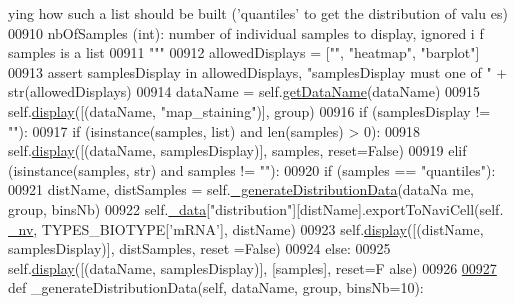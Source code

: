 \begin{DoxyCode}
{      ying how such a list should be built ('quantiles' to get the distribution of valu
      es)}
00910 \textcolor{stringliteral}{            nbOfSamples (int): number of individual samples to display, ignored i
      f samples is a list}
00911 \textcolor{stringliteral}{        """}
00912         allowedDisplays = [\textcolor{stringliteral}{""}, \textcolor{stringliteral}{"heatmap"}, \textcolor{stringliteral}{"barplot"}]
00913         \textcolor{keyword}{assert} samplesDisplay \textcolor{keywordflow}{in} allowedDisplays, \textcolor{stringliteral}{"samplesDisplay must one of "} +
       str(allowedDisplays)
00914         dataName = self.\hyperlink{classnavicom_1_1navicom_1_1NaviCom_a51ecb41beebc7636bde73be2e1ffc407}{getDataName}(dataName)
00915         self.\hyperlink{classnavicom_1_1navicom_1_1NaviCom_ad7d4390d700d4a6d2533647887f8ab94}{display}([(dataName, \textcolor{stringliteral}{"map\_staining"})], group)
00916         \textcolor{keywordflow}{if} (samplesDisplay != \textcolor{stringliteral}{""}):
00917             \textcolor{keywordflow}{if} (isinstance(samples, list) \textcolor{keywordflow}{and} len(samples) > 0):
00918                 self.\hyperlink{classnavicom_1_1navicom_1_1NaviCom_ad7d4390d700d4a6d2533647887f8ab94}{display}([(dataName, samplesDisplay)], samples, reset=\textcolor{keyword}{False})
00919             \textcolor{keywordflow}{elif} (isinstance(samples, str) \textcolor{keywordflow}{and} samples != \textcolor{stringliteral}{""}):
00920                 \textcolor{keywordflow}{if} (samples == \textcolor{stringliteral}{"quantiles"}):
00921                     distName, distSamples = self.\hyperlink{classnavicom_1_1navicom_1_1NaviCom_a4d7a97aa1699c943238988b8d41b73e0}{_generateDistributionData}(dataNa
      me, group, binsNb)
00922                     self.\hyperlink{classnavicom_1_1navicom_1_1NaviCom_a407b2b5c30a5652ee85c4be54b3e6679}{_data}[\textcolor{stringliteral}{"distribution"}][distName].exportToNaviCell(self.
      \hyperlink{classnavicom_1_1navicom_1_1NaviCom_afff3fd56fa16a68bab52ba8d801e325a}{_nv}, TYPES\_BIOTYPE[\textcolor{stringliteral}{'mRNA'}], distName)
00923                     self.\hyperlink{classnavicom_1_1navicom_1_1NaviCom_ad7d4390d700d4a6d2533647887f8ab94}{display}([(distName, samplesDisplay)], distSamples, reset
      =\textcolor{keyword}{False})
00924                 \textcolor{keywordflow}{else}:
00925                     self.\hyperlink{classnavicom_1_1navicom_1_1NaviCom_ad7d4390d700d4a6d2533647887f8ab94}{display}([(dataName, samplesDisplay)], [samples], reset=\textcolor{keyword}{F
      alse})
00926 
\hypertarget{navicom_8py_source_l00927}{}\hyperlink{classnavicom_1_1navicom_1_1NaviCom_a01066363389ca01c24f683956f3dc9ad}{00927}     \textcolor{keyword}{def }\_generateDistributionData(self, dataName, group, binsNb=10):

\end{DoxyCode}
